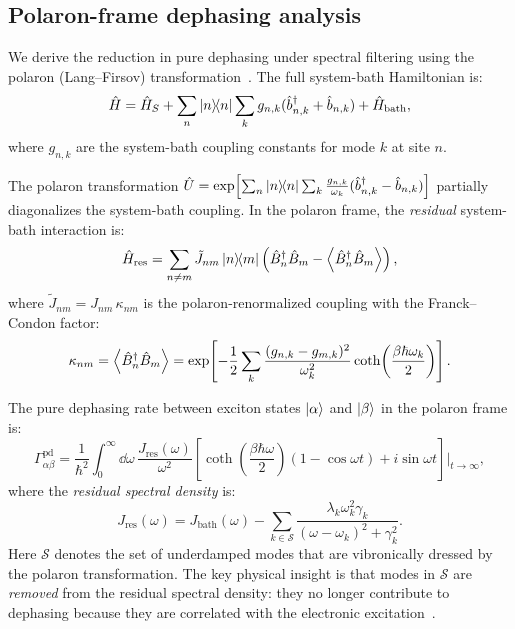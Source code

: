 \documentclass[11pt,a4paper]{article}
\begin{document}
\subsection{Polaron-frame dephasing analysis}
\label{sec:polaron_dephasing}

We derive the reduction in pure dephasing under spectral filtering using the polaron (Lang--Firsov) transformation~\cite{Huelga2013,Chin2011}. The full system-bath Hamiltonian is:
\begin{equation}
\hat{H} = \hat{H}_S + \sum_n \dyad{n} \sum_k g_{n,k}(\hat{b}_{n,k}^\dagger + \hat{b}_{n,k}) + \hat{H}_{\mathrm{bath}},
\label{eq:SI_full_hamiltonian}
\end{equation}
where $g_{n,k}$ are the system-bath coupling constants for mode $k$ at site $n$.

The polaron transformation $\hat{U} = \exp\!\left[\sum_n \dyad{n} \sum_k \frac{g_{n,k}}{\omega_k}(\hat{b}_{n,k}^\dagger - \hat{b}_{n,k})\right]$ partially diagonalizes the system-bath coupling. In the polaron frame, the \textit{residual} system-bath interaction is:
\begin{equation}
\hat{H}_{\mathrm{res}} = \sum_{n \neq m} \tilde{J}_{nm} \dyad{n}{m} \left(\hat{B}_n^\dagger \hat{B}_m - \expval{\hat{B}_n^\dagger \hat{B}_m}\right),
\label{eq:SI_residual}
\end{equation}
where $\tilde{J}_{nm} = J_{nm}\, \kappa_{nm}$ is the polaron-renormalized coupling with the Franck--Condon factor:
\begin{equation}
\kappa_{nm} = \expval{\hat{B}_n^\dagger \hat{B}_m} = \exp\!\left[-\frac{1}{2}\sum_k \frac{(g_{n,k} - g_{m,k})^2}{\omega_k^2} \coth\!\left(\frac{\beta\hbar\omega_k}{2}\right)\right].
\label{eq:SI_FC_factor}
\end{equation}

The pure dephasing rate between exciton states $\ket{\alpha}$ and $\ket{\beta}$ in the polaron frame is:
\begin{equation}
\Gamma_{\alpha\beta}^{\mathrm{pd}} = \frac{1}{\hbar^2} \int_0^\infty \dd{\omega}\, \frac{J_{\mathrm{res}}(\omega)}{\omega^2} \left[\coth\!\left(\frac{\beta\hbar\omega}{2}\right)(1 - \cos\omega t) + i\sin\omega t\right]\bigg|_{t\to\infty},
\label{eq:SI_dephasing_rate}
\end{equation}
where the \textit{residual spectral density} is:
\begin{equation}
\boxed{J_{\mathrm{res}}(\omega) = J_{\mathrm{bath}}(\omega) - \sum_{k \in \mathcal{S}} \frac{\lambda_k \omega_k^2 \gamma_k}{(\omega - \omega_k)^2 + \gamma_k^2}.}
\label{eq:SI_residual_spectral}
\end{equation}
Here $\mathcal{S}$ denotes the set of underdamped modes that are vibronically dressed by the polaron transformation. The key physical insight is that modes in $\mathcal{S}$ are \textit{removed} from the residual spectral density: they no longer contribute to dephasing because they are correlated with the electronic excitation~\cite{Chin2011,Chin2013}.
\end{document}
